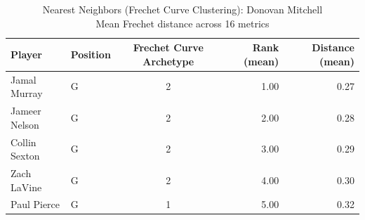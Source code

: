 \begin{table}[t]
\caption*{
{\fontsize{20}{25} Nearest Neighbors (Frechet Curve Clustering): Donovan Mitchell\fontsize{12}{15}\selectfont } \\ 
{\fontsize{14}{17}\selectfont  Mean Frechet distance across 16 metrics\fontsize{12}{15}\selectfont }
} 
\fontsize{12.0pt}{14.0pt}\selectfont
\begin{tabular*}{\linewidth}{@{\extracolsep{\fill}}llcrr}
\toprule
Player & Position & Frechet Curve Archetype & Rank (mean) & Distance (mean) \\ 
\midrule\addlinespace[2.5pt]
Jamal Murray & G & 2 & 1.00 & 0.27 \\ 
Jameer Nelson & G & 2 & 2.00 & 0.28 \\ 
Collin Sexton & G & 2 & 3.00 & 0.29 \\ 
Zach LaVine & G & 2 & 4.00 & 0.30 \\ 
Paul Pierce & G & 1 & 5.00 & 0.32 \\ 
\bottomrule
\end{tabular*}
\end{table}

